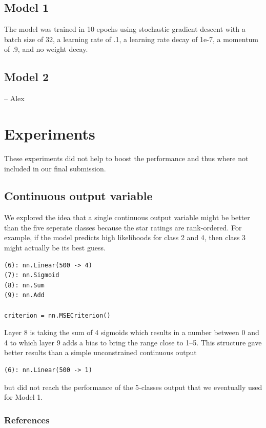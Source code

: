 \documentclass{article} %
\begin{document}
\subsection{Model 1}

The model was trained in 10 epochs using stochastic gradient descent with a batch size of 32, a learning rate of .1, a learning rate decay of 1e-7, a momentum of .9, and no weight decay.

\subsection{Model 2}

-- Alex


\section{Experiments}

These experiments did not help to boost the performance and thus where not included in our final submission.

\subsection{Continuous output variable}
We explored the idea that a single continuous output variable might be better than the five seperate classes because the star ratings are rank-ordered. 
For example, if the model predicts high likelihoods for class 2 and 4, then class 3 might actually be its best guess.
\begin{verbatim}
(6): nn.Linear(500 -> 4)
(7): nn.Sigmoid
(8): nn.Sum
(9): nn.Add

criterion = nn.MSECriterion()
\end{verbatim}
Layer 8 is taking the sum of 4 sigmoids which results in a number between 0 and 4 to which layer 9 adds a bias to bring the range close to 1--5.
This structure gave better results than a simple unconstrained continuous output 
\begin{verbatim}
(6): nn.Linear(500 -> 1)
\end{verbatim}
but did not reach the performance of the 5-classes output that we eventually used for Model 1.


\subsubsection*{References}

\small{

}
\end{document}

